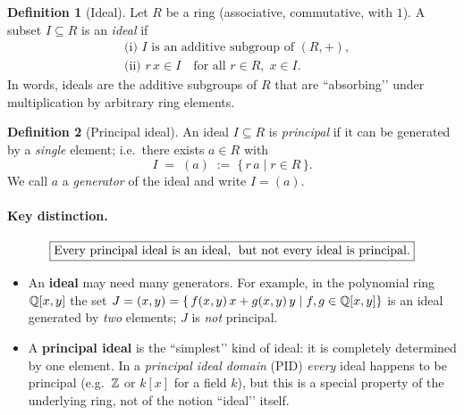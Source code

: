 \documentclass[12pt]{article}
\theoremstyle{definition} %
\newtheorem{definition}{Definition}
\theoremstyle{plain} %
\begin{document}
\begin{definition}[Ideal]
  Let \(R\) be a ring (associative, commutative, with \(1\)).  
  A subset \(I\subseteq R\) is an \emph{ideal} if
  \[
    \begin{aligned}
      &\text{(i) } I \text{ is an additive subgroup of } (R,+), \\[-2pt]
      &\text{(ii) } r\,x \in I \quad\text{for all } r\in R,\;x\in I .
    \end{aligned}
  \]
  In words, ideals are the additive subgroups of \(R\) that are
  ``absorbing’’ under multiplication by arbitrary ring elements.
\end{definition}

\begin{definition}[Principal ideal]
  An ideal \(I\subseteq R\) is \emph{principal} if it can be generated by a
  \emph{single} element; i.e.\ there exists \(a\in R\) with
  \[
      I \;=\; (a)
      \;:=\;
      \{\,r\,a \mid r\in R\,\}.
  \]
  We call \(a\) a \emph{generator} of the ideal and write \(I=(a)\).
\end{definition}

\paragraph{Key distinction.}
\[
  \boxed{\text{Every principal ideal is an ideal,\; but not every ideal is principal.}}
\]

\begin{itemize}
  \item An \textbf{ideal} may need many generators.
        For example, in the polynomial ring \(\Bbb Q[x,y]\) the set
        \(
          J = (x,y) = \{\,f(x,y)\,x + g(x,y)\,y \mid f,g\in\Bbb Q[x,y]\}
        \)
        is an ideal generated by \emph{two} elements; \(J\) is \emph{not} principal.
  \item A \textbf{principal ideal} is the ``simplest’’ kind of ideal:
        it is completely determined by one element.
        In a \emph{principal ideal domain} (PID) \emph{every} ideal happens to be principal
        (e.g.\ \(\Bbb Z\) or \(k[x]\) for a field \(k\)), but this is a special property of the
        underlying ring, not of the notion ``ideal’’ itself.
\end{itemize}
\end{document}
